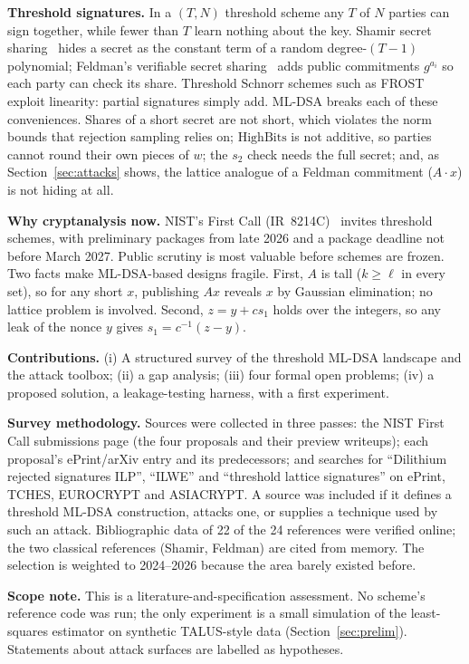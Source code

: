 \documentclass[10pt,conference,a4paper]{IEEEtran}
\newcommand{\HB}{\mathrm{HighBits}}
\begin{document}
\textbf{Threshold signatures.} In a $(T,N)$ threshold scheme any $T$ of $N$ parties can sign together, while fewer than
$T$ learn nothing about the key. Shamir secret sharing~\cite{shamir} hides a secret as the constant term of a random
degree-$(T-1)$ polynomial; Feldman's verifiable secret sharing~\cite{feldman} adds public commitments $g^{a_i}$ so each
party can check its share. Threshold Schnorr schemes such as FROST~\cite{frost} exploit linearity: partial signatures
simply add. ML-DSA breaks each of these conveniences. Shares of a short secret are not short, which violates the norm
bounds that rejection sampling relies on; $\HB$ is not additive, so parties cannot round their own pieces of $w$; the
$s_2$ check needs the full secret; and, as Section~\ref{sec:attacks} shows, the lattice analogue of a Feldman commitment
($A\cdot x$) is not hiding at all.

\textbf{Why cryptanalysis now.} NIST's First Call (IR~8214C)~\cite{ir8214c} invites threshold schemes, with preliminary
packages from late 2026 and a package deadline not before March 2027. Public scrutiny is most valuable before schemes
are frozen. Two facts make ML-DSA-based designs fragile. First, $A$ is tall ($k\ge\ell$ in every set), so for any short
$x$, publishing $Ax$ reveals $x$ by Gaussian elimination; no lattice problem is involved. Second, $z=y+cs_1$ holds over
the integers, so any leak of the nonce $y$ gives $s_1=c^{-1}(z-y)$.

\textbf{Contributions.} (i) A structured survey of the threshold ML-DSA landscape and the attack toolbox; (ii) a gap
analysis; (iii) four formal open problems; (iv) a proposed solution, a leakage-testing harness, with a first experiment.

\textbf{Survey methodology.} Sources were collected in three passes: the NIST First Call submissions page (the four
proposals and their preview writeups); each proposal's ePrint/arXiv entry and its predecessors; and searches for
``Dilithium rejected signatures ILP'', ``ILWE'' and ``threshold lattice signatures'' on ePrint, TCHES, EUROCRYPT and
ASIACRYPT. A source was included if it defines a threshold ML-DSA construction, attacks one, or supplies a technique used
by such an attack. Bibliographic data of 22 of the 24 references were verified online; the two classical references
(Shamir, Feldman) are cited from memory. The selection is weighted to 2024--2026 because the area barely existed before.

\textbf{Scope note.} This is a literature-and-specification assessment. No scheme's reference code was run; the only
experiment is a small simulation of the least-squares estimator on synthetic TALUS-style data
(Section~\ref{sec:prelim}). Statements about attack surfaces are labelled as hypotheses.
\end{document}
